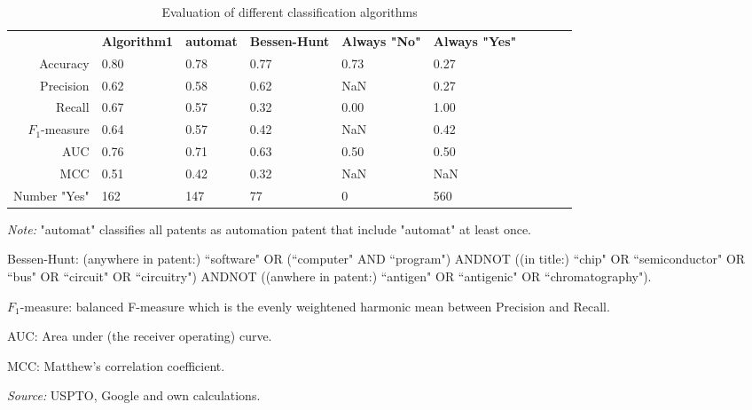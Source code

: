 \begin{table}
\begin{small}
\begin{threeparttable}
\caption{{\normalsize Evaluation of different classification algorithms}}
\label{table:table_compare_classalg}
\begin{tabular}{rlllllllll}
\toprule 
 & \textbf{Algorithm1} & \textbf{automat} & \textbf{Bessen-Hunt} & \textbf{Always "No"} & \textbf{Always "Yes"}  \tabularnewline 
Accuracy & 0.80 & 0.78 & 0.77 & 0.73 & 0.27 & & & &  \tabularnewline 
Precision & 0.62 & 0.58 & 0.62 & NaN & 0.27 & & & &  \tabularnewline 
Recall & 0.67 & 0.57 & 0.32 & 0.00 & 1.00 & & & &  \tabularnewline 
$F_1$-measure & 0.64 & 0.57 & 0.42 & NaN & 0.42 & & & &  \tabularnewline 
AUC & 0.76 & 0.71 & 0.63 & 0.50 & 0.50 & & & &  \tabularnewline 
MCC & 0.51 & 0.42 & 0.32 & NaN & NaN & & & &  \tabularnewline 
Number "Yes" & 162 & 147 & 77 & 0 & 560 & & & &  \tabularnewline 
\bottomrule 
\end{tabular} 
\begin{tablenotes}
\small
\item\textit{Note:} "automat" classifies all patents as automation patent that include "automat" at least once.\item Bessen-Hunt: (anywhere in patent:) ``software" OR (``computer" AND ``program") ANDNOT ((in title:) ``chip" OR ``semiconductor" OR ``bus" OR ``circuit" OR ``circuitry") ANDNOT ((anwhere in patent:) ``antigen" OR ``antigenic" OR ``chromatography").
\item $F_1$-measure: balanced F-measure which is the evenly weightened harmonic mean between Precision and Recall. 
\item AUC: Area under (the receiver operating) curve.
\item MCC: Matthew's correlation coefficient.
\item\textit{Source:} USPTO, Google and own calculations.
\end{tablenotes}
\end{threeparttable}
\end{small}
\end{table}
